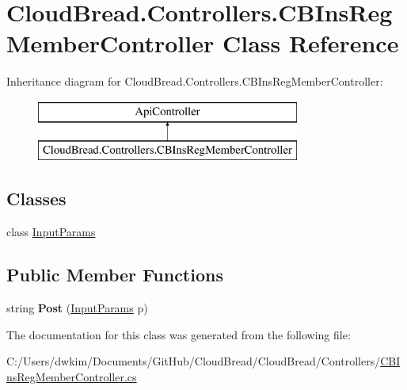 \hypertarget{class_cloud_bread_1_1_controllers_1_1_c_b_ins_reg_member_controller}{}\section{Cloud\+Bread.\+Controllers.\+C\+B\+Ins\+Reg\+Member\+Controller Class Reference}
\label{class_cloud_bread_1_1_controllers_1_1_c_b_ins_reg_member_controller}
Inheritance diagram for Cloud\+Bread.\+Controllers.\+C\+B\+Ins\+Reg\+Member\+Controller\+:\begin{figure}[H]
\begin{center}
\leavevmode
\includegraphics[height=2.000000cm]{class_cloud_bread_1_1_controllers_1_1_c_b_ins_reg_member_controller}
\end{center}
\end{figure}
\subsection*{Classes}
\begin{DoxyCompactItemize}
\item 
class \hyperlink{class_cloud_bread_1_1_controllers_1_1_c_b_ins_reg_member_controller_1_1_input_params}{Input\+Params}
\end{DoxyCompactItemize}
\subsection*{Public Member Functions}
\begin{DoxyCompactItemize}
\item 
string {\bfseries Post} (\hyperlink{class_cloud_bread_1_1_controllers_1_1_c_b_ins_reg_member_controller_1_1_input_params}{Input\+Params} p)\hypertarget{class_cloud_bread_1_1_controllers_1_1_c_b_ins_reg_member_controller_a576b3c4b0be10af8a124ad04d52bcb88}{}\label{class_cloud_bread_1_1_controllers_1_1_c_b_ins_reg_member_controller_a576b3c4b0be10af8a124ad04d52bcb88}

\end{DoxyCompactItemize}


The documentation for this class was generated from the following file\+:\begin{DoxyCompactItemize}
\item 
C\+:/\+Users/dwkim/\+Documents/\+Git\+Hub/\+Cloud\+Bread/\+Cloud\+Bread/\+Controllers/\hyperlink{_c_b_ins_reg_member_controller_8cs}{C\+B\+Ins\+Reg\+Member\+Controller.\+cs}\end{DoxyCompactItemize}
